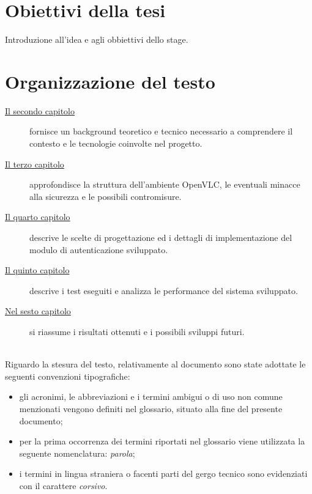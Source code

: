 \section{Obiettivi della tesi}

Introduzione all'idea e agli obbiettivi dello stage.

\section{Organizzazione del testo}

\begin{description}
    \item[{\hyperref[cap:background]{Il secondo capitolo}}] fornisce un background teoretico e tecnico necessario a comprendere il contesto e le tecnologie coinvolte nel progetto. 
    
    \item[{\hyperref[cap:analisi]{Il terzo capitolo}}] approfondisce la struttura dell'ambiente OpenVLC, le eventuali minacce alla sicurezza e le possibili contromisure.
    
    \item[{\hyperref[cap:progettazione]{Il quarto capitolo}}] descrive le scelte di progettazione ed i dettagli di implementazione del modulo di autenticazione sviluppato.
    
    \item[{\hyperref[cap:test]{Il quinto capitolo}}] descrive i test eseguiti e analizza le performance del sistema sviluppato.
        
    \item[{\hyperref[cap:conclusioni]{Nel sesto capitolo}}] si riassume i risultati ottenuti e i possibili sviluppi futuri.
\end{description}

\noindent \\Riguardo la stesura del testo, relativamente al documento sono state adottate le seguenti convenzioni tipografiche:
\begin{itemize}
	\item gli acronimi, le abbreviazioni e i termini ambigui o di uso non comune menzionati vengono definiti nel glossario, situato alla fine del presente documento;
	\item per la prima occorrenza dei termini riportati nel glossario viene utilizzata la seguente nomenclatura: \emph{parola}\glsfirstoccur;
	\item i termini in lingua straniera o facenti parti del gergo tecnico sono evidenziati con il carattere \emph{corsivo}.
\end{itemize}